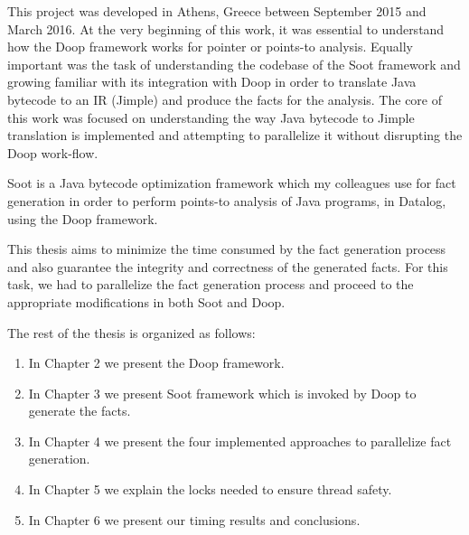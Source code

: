 \documentclass{dithesis}
\begin{document}
\tableofcontents
\listoffigures
\listoftables



\begin{thesisprologue}[Preface]
    This project was developed in Athens, Greece between September 2015 and March 2016. At the very beginning of this work, it was essential to understand how the Doop framework works for pointer or points-to analysis. Equally important was the task of understanding the codebase of the Soot framework and growing familiar with its integration with Doop in order to translate Java bytecode to an IR (Jimple) and produce the facts for the analysis. The core of this work was focused on understanding the way Java bytecode to Jimple translation is implemented and attempting to parallelize it without disrupting the Doop work-flow.
\end{thesisprologue}

	Soot \cite{Sable: Soot} is a Java bytecode optimization framework which my colleagues use for fact generation in order to perform points-to analysis of Java programs, in Datalog, using the Doop framework. \cite{Doop: Framework for Java Pointer Analysis} 

	This thesis aims to minimize the time consumed by the fact generation process and also guarantee the integrity and correctness of the generated facts. For this task, we had to parallelize the fact generation process and proceed to the appropriate modifications in both Soot and Doop.

	The rest of the thesis is organized as follows:
	\begin{enumerate}
		\item In Chapter 2 we present the Doop framework.
		\item In Chapter 3 we present Soot framework which is invoked by Doop to generate the facts.
		\item In Chapter 4 we present the four implemented approaches to parallelize fact generation.
		\item In Chapter 5 we explain the locks needed to ensure thread safety.
		\item In Chapter 6 we present our timing results and conclusions.
	\end{enumerate}
\end{document}
